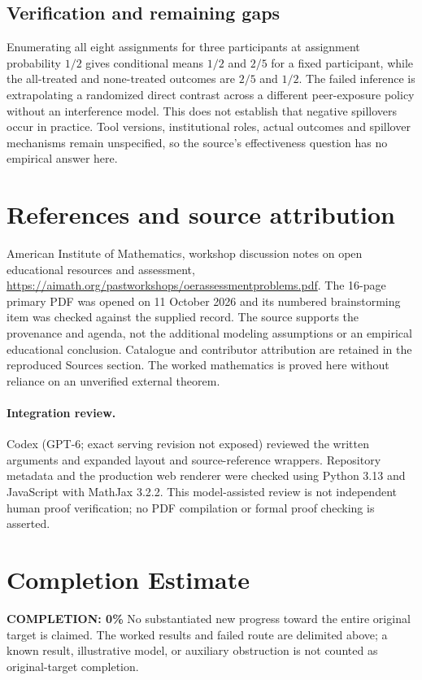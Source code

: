 \documentclass[11pt]{article}
\begin{document}
\subsection{Verification and remaining gaps}
Enumerating all eight assignments for three participants at assignment probability $1/2$ gives conditional means $1/2$ and $2/5$ for a fixed participant, while the all-treated and none-treated outcomes are $2/5$ and $1/2$. The failed inference is extrapolating a randomized direct contrast across a different peer-exposure policy without an interference model. This does not establish that negative spillovers occur in practice. Tool versions, institutional roles, actual outcomes and spillover mechanisms remain unspecified, so the source's effectiveness question has no empirical answer here.

\section{References and source attribution}
American Institute of Mathematics, workshop discussion notes on open educational resources and assessment, \url{https://aimath.org/pastworkshops/oerassessmentproblems.pdf}. The 16-page primary PDF was opened on 11 October 2026 and its numbered brainstorming item was checked against the supplied record. The source supports the provenance and agenda, not the additional modeling assumptions or an empirical educational conclusion. Catalogue and contributor attribution are retained in the reproduced Sources section. The worked mathematics is proved here without reliance on an unverified external theorem.


\paragraph{Integration review.} Codex (GPT-6; exact serving revision not exposed) reviewed the written arguments and expanded layout and source-reference wrappers. Repository metadata and the production web renderer were checked using Python 3.13 and JavaScript with MathJax 3.2.2. This model-assisted review is not independent human proof verification; no PDF compilation or formal proof checking is asserted.

\section{Completion Estimate}
\noindent\textbf{COMPLETION: 0\%}
No substantiated new progress toward the entire original target is claimed. The worked results and failed route are delimited above; a known result, illustrative model, or auxiliary obstruction is not counted as original-target completion.
\end{document}
